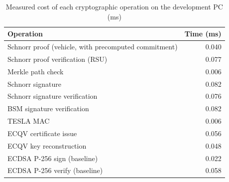 \begin{table}[htbp]\centering\small
\caption{Measured cost of each cryptographic operation on the development PC (ms)}\label{tab:compute}
\begin{tabular}{lr}
\toprule
Operation & Time (ms) \\
\midrule
Schnorr proof (vehicle, with precomputed commitment) & 0.040 \\
Schnorr proof verification (RSU) & 0.077 \\
Merkle path check & 0.006 \\
Schnorr signature & 0.082 \\
Schnorr signature verification & 0.076 \\
BSM signature verification & 0.082 \\
TESLA MAC & 0.006 \\
ECQV certificate issue & 0.056 \\
ECQV key reconstruction & 0.048 \\
ECDSA P-256 sign (baseline) & 0.022 \\
ECDSA P-256 verify (baseline) & 0.058 \\
\bottomrule
\end{tabular}
\end{table}
